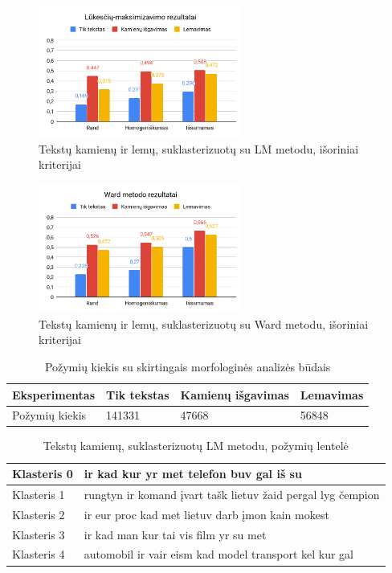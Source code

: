 \documentclass{VUMIFInfBakalaurinis}
\begin{document}
\begin{figure}[H]
	\centering
	\includegraphics[width=0.6\textwidth]{./img/image17.png}
  \caption{Tekstų kamienų ir lemų, suklasterizuotų su LM metodu, išoriniai
  kriterijai}
\end{figure}

\begin{figure}[H]
	\centering
	\includegraphics[width=0.6\textwidth]{./img/image16.png}
  \caption{Tekstų kamienų ir lemų, suklasterizuotų su Ward metodu, išoriniai
  kriterijai}
\end{figure}

\begin{table}[H]
  \centering
\caption{Požymių kiekis su skirtingais morfologinės analizės būdais}
\small
\begin{tabular}{|l|l|l|l|}
\hline
Eksperimentas & Tik tekstas & Kamienų išgavimas & Lemavimas \\ \hline
Požymių kiekis        & 141331      & 47668             & 56848  \\  \hline
\end{tabular}
\normalsize
\end{table}

\begin{table}[H]
  \centering
\caption{Tekstų kamienų, suklasterizuotų LM metodu, požymių lentelė}
\small
\begin{tabular}{|l|l|}
\hline
Klasteris 0 & ir kad kur yr met telefon buv gal iš su                     \\ \hline
Klasteris 1 & rungtyn ir komand įvart tašk lietuv žaid pergal lyg čempion \\ \hline
Klasteris 2 & ir eur proc kad met lietuv darb įmon kain mokest            \\ \hline
Klasteris 3 & ir kad man kur tai vis film yr su met                       \\ \hline
Klasteris 4 & automobil ir vair eism kad model transport kel kur gal      \\ \hline
\end{tabular}
\normalsize
\end{table}
\end{document}
